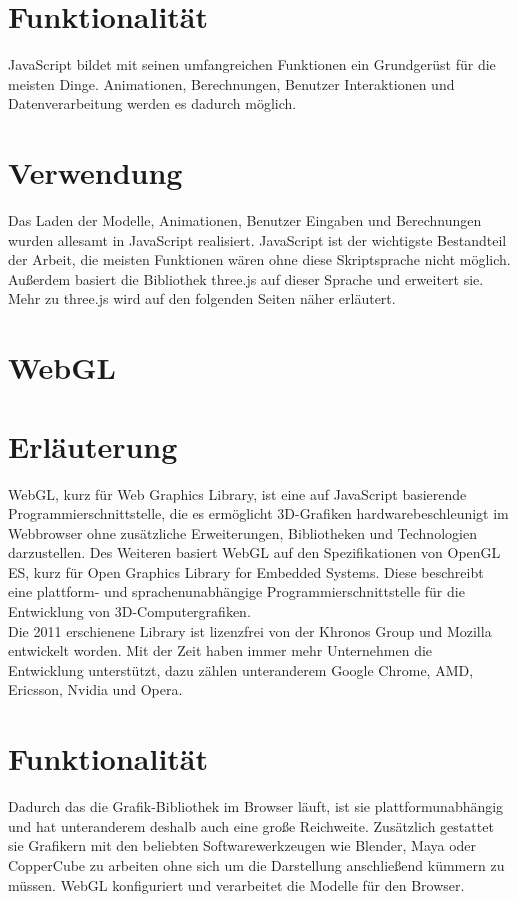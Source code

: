 \section*{Funktionalität}
JavaScript bildet mit seinen umfangreichen Funktionen ein Grundgerüst für die meisten Dinge. Animationen, Berechnungen, Benutzer Interaktionen und Datenverarbeitung werden es dadurch möglich.


\section*{Verwendung}
Das Laden der Modelle, Animationen, Benutzer Eingaben und Berechnungen wurden allesamt in JavaScript realisiert. JavaScript ist der wichtigste Bestandteil der Arbeit, die meisten Funktionen wären ohne diese Skriptsprache nicht möglich.  Außerdem basiert die Bibliothek three.js auf dieser Sprache und erweitert sie. Mehr zu three.js wird auf den folgenden Seiten näher erläutert.


\newpage
\clearpage


\section{WebGL}

\section*{Erläuterung}
WebGL, kurz für Web Graphics Library, ist eine auf JavaScript basierende Programmierschnittstelle, die es ermöglicht 3D-Grafiken hardwarebeschleunigt im Webbrowser ohne zusätzliche Erweiterungen, Bibliotheken und Technologien darzustellen. Des Weiteren basiert WebGL auf den Spezifikationen von OpenGL ES, kurz für Open Graphics Library for Embedded Systems. Diese beschreibt eine plattform- und sprachenunabhängige Programmierschnittstelle für die Entwicklung von 3D-Computergrafiken. 
\\
Die 2011 erschienene Library ist lizenzfrei von der Khronos Group und Mozilla entwickelt worden. Mit der Zeit haben immer mehr Unternehmen die Entwicklung unterstützt, dazu zählen unteranderem Google Chrome, AMD, Ericsson, Nvidia und Opera. 


\section*{Funktionalität}
Dadurch das die Grafik-Bibliothek im Browser läuft, ist sie plattformunabhängig und hat unteranderem deshalb auch eine große Reichweite. Zusätzlich gestattet sie Grafikern mit den beliebten Softwarewerkzeugen wie Blender, Maya oder CopperCube zu arbeiten ohne sich um die Darstellung anschließend kümmern zu müssen. WebGL konfiguriert und verarbeitet die Modelle für den Browser.


